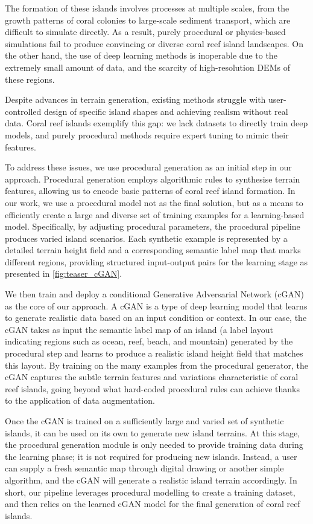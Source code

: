 The formation of these islands involves processes at multiple scales, from the growth patterns of coral colonies to large-scale sediment transport, which are difficult to simulate directly. As a result, purely procedural or physics-based simulations fail to produce convincing or diverse coral reef island landscapes. On the other hand, the use of deep learning methods is inoperable due to the extremely small amount of data, and the scarcity of high-resolution DEMs of these regions.

Despite advances in terrain generation, existing methods struggle with user-controlled design of specific island shapes and achieving realism without real data. Coral reef islands exemplify this gap: we lack datasets to directly train deep models, and purely procedural methods require expert tuning to mimic their features.

To address these issues, we use procedural generation as an initial step in our approach. Procedural generation employs algorithmic rules to synthesise terrain features, allowing us to encode basic patterns of coral reef island formation. In our work, we use a procedural model not as the final solution, but as a means to efficiently create a large and diverse set of training examples for a learning-based model. Specifically, by adjusting procedural parameters, the procedural pipeline produces varied island scenarios. Each synthetic example is represented by a detailed terrain height field and a corresponding semantic label map that marks different regions, providing structured input-output pairs for the learning stage as presented in \cref{fig:teaser_cGAN}.

We then train and deploy a conditional Generative Adversarial Network (cGAN) as the core of our approach. A cGAN is a type of deep learning model that learns to generate realistic data based on an input condition or context. In our case, the cGAN takes as input the semantic label map of an island (a label layout indicating regions such as ocean, reef, beach, and mountain) generated by the procedural step and learns to produce a realistic island height field that matches this layout. By training on the many examples from the procedural generator, the cGAN captures the subtle terrain features and variations characteristic of coral reef islands, going beyond what hard-coded procedural rules can achieve thanks to the application of data augmentation.

Once the cGAN is trained on a sufficiently large and varied set of synthetic islands, it can be used on its own to generate new island terrains. At this stage, the procedural generation module is only needed to provide training data during the learning phase; it is not required for producing new islands. Instead, a user can supply a fresh semantic map through digital drawing or another simple algorithm, and the cGAN will generate a realistic island terrain accordingly. In short, our pipeline leverages procedural modelling to create a training dataset, and then relies on the learned cGAN model for the final generation of coral reef islands.


